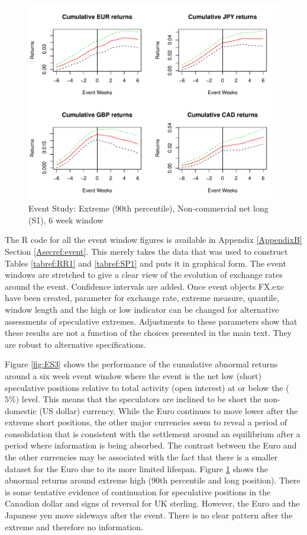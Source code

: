 \documentclass[12pt, a4paper, oneside]{article} %
\begin{document}
\begin{figure}[h!]
\graphicspath{{../Figures/}}
\centering
\caption{Event Study:  Extreme (90th percentile), Non-commercial net long (S1), 6 week window}
\label{fig:ES4}
\includegraphics[scale=0.8]{FPCum6wa}
\end{figure}

The R code for all the event window figures is available in Appendix \ref{AppendixB} Section \ref{Asecref:event}.  This merely takes the data that was used to construct Tables \ref{tabref:RR1} and \ref{tabref:SP1} and puts it in graphical form.  The event windows are stretched to give a clear view of the evolution of exchange rates  around the event.  Confidence intervals are added.  Once event objects FX.exc have been created, parameter for exchange rate, extreme measure, quantile, window length and the high or low indicator can be changed for alternative assessments of speculative extremes. Adjustments to these parameters show that these results are not a function of the choices presented in the main text.  They are robust to alternative specifications. 

Figure \ref{fig:ES3} shows the performance of the cumulative abnormal returns around a six week event window where the event is the net low (short) speculative positions relative to total activity (open interest) at or below the ($5\%)$ level.  This means that the speculators are inclined to be short the non-domestic (US dollar) currency.  While the Euro continues to move lower after the extreme short positions, the other major currencies seem to reveal a period of consolidation that is consistent with the settlement around an equilibrium after a period where information is being absorbed.  The contrast between the Euro and the other currencies may be associated with the fact that there is a smaller dataset for the Euro due to its more limited lifespan.  Figure \ref{fig:ES4} shows the abnormal returns around extreme high (90th percentile and long position).  There is some tentative evidence of continuation for speculative positions in the Canadian dollar and signs of reversal for UK sterling.  However, the Euro and the Japanese yen move sideways after the event.  There is no clear pattern after the extreme and therefore no information.  
\end{document}
